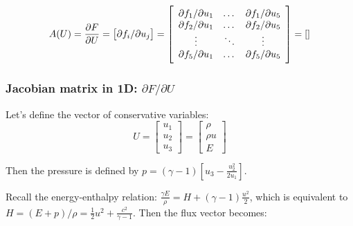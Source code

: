 \documentclass{article}
\begin{document}
\begin{equation}
  A(U)=\frac{\partial F}{\partial U} = \left[ \partial f_i/\partial u_j \right] = \left [
    \begin{array}{c c c}
      \partial f_1/\partial u_1 & \dots & \partial f_1/\partial u_5\\
      \partial f_2/\partial u_1 & \dots & \partial f_2/\partial u_5\\
      \vdots & \ddots & \vdots\\
      \partial f_5/\partial u_1 & \dots & \partial f_5/\partial u_5\\
    \end{array} \right ]
  = \left[
    \begin{array}{c c c c c}
      
    \end{array} \right ]
\end{equation}

\subsubsection*{Jacobian matrix in 1D: \boldmath $\partial F/\partial U$}

Let's define the vector of conservative variables:
\begin{equation}
  U = \left[
    \begin{array}{c}
      u_1\\
      u_2\\
      u_3
    \end{array}
  \right] = \left[
    \begin{array}{c}
      \rho\\
      \rho u\\
      E
    \end{array}
  \right]
\end{equation}

Then the pressure is defined by $p=(\gamma-1)[u_3-\frac{u_2^2}{2u_1} ]$.

Recall the energy-enthalpy relation: $\frac{\gamma E}{\rho} = H+(\gamma-1)\frac{u^2}{2}$, which is equivalent to $H=(E+p)/\rho = \frac{1}{2}u^2+\frac{c^2}{\gamma-1}$. Then the flux vector becomes:
\end{document}
